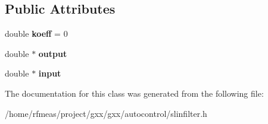 \subsection*{Public Attributes}
\begin{DoxyCompactItemize}
\item 
double {\bfseries koeff} = 0\hypertarget{classgxx_1_1autocontrol_1_1stepped__aperiodic__filter_a1aaa40b2aa69ddc68bf4cba5e87e1723}{}\label{classgxx_1_1autocontrol_1_1stepped__aperiodic__filter_a1aaa40b2aa69ddc68bf4cba5e87e1723}

\item 
double $\ast$ {\bfseries output}\hypertarget{classgxx_1_1autocontrol_1_1stepped__aperiodic__filter_a6e4a90da7308674dd9404dcc71b8fe4b}{}\label{classgxx_1_1autocontrol_1_1stepped__aperiodic__filter_a6e4a90da7308674dd9404dcc71b8fe4b}

\item 
double $\ast$ {\bfseries input}\hypertarget{classgxx_1_1autocontrol_1_1stepped__aperiodic__filter_a8de3d44839aafe458fec4ffeb53b3eaa}{}\label{classgxx_1_1autocontrol_1_1stepped__aperiodic__filter_a8de3d44839aafe458fec4ffeb53b3eaa}

\end{DoxyCompactItemize}


The documentation for this class was generated from the following file\+:\begin{DoxyCompactItemize}
\item 
/home/rfmeas/project/gxx/gxx/autocontrol/slinfilter.\+h\end{DoxyCompactItemize}
